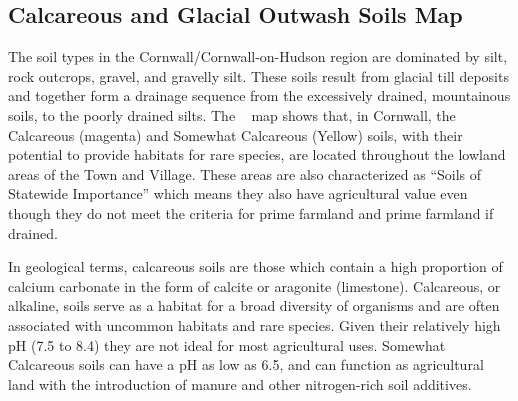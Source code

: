 
\label{map:calcaerousandglacialoutwashsoils}
\subsection*{Calcareous and Glacial Outwash Soils Map}\label{subsec:calcareous}
The soil types in the Cornwall/Cornwall-on-Hudson region are dominated by silt, 
rock outcrops, gravel, and gravelly silt. These soils result from glacial till 
deposits and together form a drainage sequence from the excessively drained, 
mountainous soils, to the poorly drained silts. The ~
map shows that, in Cornwall, the Calcareous (magenta) and Somewhat 
Calcareous (Yellow) soils, with their potential to provide habitats for rare 
species, are located throughout the lowland areas of the Town and Village. These 
areas are also characterized as “Soils of Statewide Importance” which means they 
also have agricultural value even though they do not meet the criteria for prime 
farmland and prime farmland if drained.

In geological terms, calcareous soils are those which contain a high proportion 
of calcium carbonate in the form of calcite or aragonite (limestone). 
Calcareous, or alkaline, soils serve as a habitat for a broad diversity of 
organisms and are often associated with uncommon habitats and rare species. 
Given their relatively high pH (7.5 to 8.4) they are not ideal for most 
agricultural uses. Somewhat Calcareous soils can have a pH as low as 6.5, and 
can function as agricultural land with the introduction of manure and other 
nitrogen-rich soil additives.
